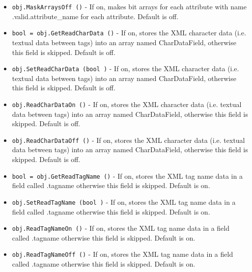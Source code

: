 \begin{itemize}
\item  \verb|obj.MaskArraysOff ()| -  If on, makes bit arrays for each attribute with name .valid.attribute\_name
 for each attribute.  Default is off.

\item  \verb|bool = obj.GetReadCharData ()| -  If on, stores the XML character data (i.e. textual data between tags)
 into an array named CharDataField, otherwise this field is skipped.
 Default is off.

\item  \verb|obj.SetReadCharData (bool )| -  If on, stores the XML character data (i.e. textual data between tags)
 into an array named CharDataField, otherwise this field is skipped.
 Default is off.

\item  \verb|obj.ReadCharDataOn ()| -  If on, stores the XML character data (i.e. textual data between tags)
 into an array named CharDataField, otherwise this field is skipped.
 Default is off.

\item  \verb|obj.ReadCharDataOff ()| -  If on, stores the XML character data (i.e. textual data between tags)
 into an array named CharDataField, otherwise this field is skipped.
 Default is off.

\item  \verb|bool = obj.GetReadTagName ()| -  If on, stores the XML tag name data in a field called .tagname
 otherwise this field is skipped.
 Default is on.

\item  \verb|obj.SetReadTagName (bool )| -  If on, stores the XML tag name data in a field called .tagname
 otherwise this field is skipped.
 Default is on.

\item  \verb|obj.ReadTagNameOn ()| -  If on, stores the XML tag name data in a field called .tagname
 otherwise this field is skipped.
 Default is on.

\item  \verb|obj.ReadTagNameOff ()| -  If on, stores the XML tag name data in a field called .tagname
 otherwise this field is skipped.
 Default is on.

\end{itemize}

